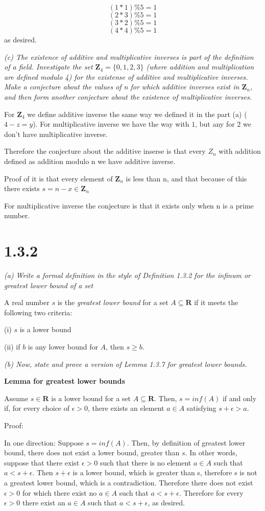 \documentclass[11pt,oneside,titlepage]{article}
\begin{document}
$$ (1 * 1) \% 5 = 1 $$
$$ (2 * 3) \% 5 = 1 $$
$$ (3 * 2) \% 5 = 1 $$
$$ (4 * 4) \% 5 = 1 $$
as desired.

\textit{(c) The existence of additive and multiplicative inverses is part of
  the definition of a field. Investigate the set $\textbf{Z}_4 = \{0, 1, 2,
  3\}$ (where addition and multiplication are defined modulo 4) for the
  existense of additive and multiplicative inverses. Make a conjecture about
  the values of n for which additive inverses exist in $\textbf{Z}_n$, and then
  form another conjecture about the existence of multiplicative inverses.}

For $\textbf{Z}_4$ we define additive inverse the same way we defined it
in the  part (a) ($4 - z = y$). For multiplicative inverse we have the way
with $1$, but any for 2 we don't have multiplicative inverse.

Therefore the conjecture about the additive inserse is that every $Z_n$ with
addition defined as addition modulo n we have additive inverse.

Proof of it is that every element of $\textbf{Z}_n$  is less than n, and that
because of this there exists $s = n - x \in \textbf{Z}_n$

For multiplicative inverse the conjecture is that it exists only when
n is a prime number.

\section*{1.3.2}
\textit{(a) Write a formal definition in the style of Definition 1.3.2 for the
  infinum or greatest lower bound of a set}

A real number $s$ is the \textit{greatest lower bound} for a set
$A \subseteq \textbf{R}$ if it meets the following two criteria:

(i) $s$ is a lower bound

(ii) if $b$ is any lower bound for $A$, then $s \geq b$.

\textit{(b) Now, state and prove a version of Lemma 1.3.7 for greatest lower
  bounds.}

\textbf{Lemma for greatest lower bounds}

Assume $s \in \textbf{R}$ is a lower bound for a set  $A \subseteq \textbf{R}$.
Then, $s = inf(A)$ if and only if, for every choice of $\epsilon > 0$, there
exists an element $a \in A$ satisfying $s + \epsilon > a$.

Proof:

In one direction: Suppose $s = inf(A)$. Then, by definition of greatest lower
bound, there does not exist a lower bound, greater than $s$. In other words,
suppose that there exist $\epsilon > 0$ such that there is no element $a \in A$
such that $a < s + \epsilon$. Then $s + \epsilon$ is a lower bound, which is
greater than s, therefore s is not a greatest lower bound, which is a
contradiction. Therefore there does not exist $\epsilon > 0$ for which
there exist no $a \in A$ such that $a < s + \epsilon$. Therefore for
every $\epsilon > 0$ there exist an $a \in A$  such that $a < s + \epsilon$,
as desired.
\end{document}
